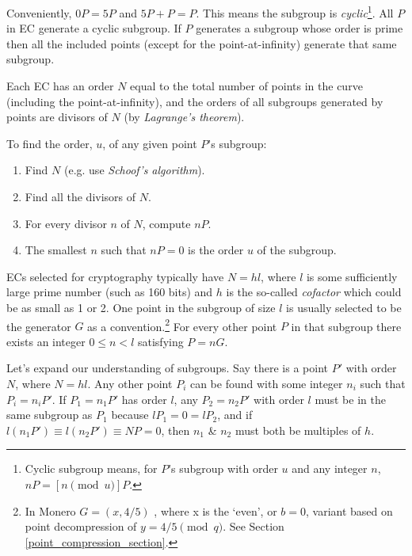 Conveniently, $0P = 5P$ and $5P + P = P$. This means the subgroup is {\em cyclic}\footnote{\label{cyclical_note}Cyclic subgroup means, for $P$'s subgroup with order $u$ and any integer $n$, $n P = [n \pmod{u}] P$.}. All $P$ in EC generate a cyclic subgroup. If $P$ generates a subgroup whose order is prime then all the included points (except for the point-at-infinity) generate that same subgroup.

Each EC has an order $N$ equal to the total number of points in the curve (including the point-at-infinity), and the orders of all subgroups generated by points are divisors of $N$ (by {\em Lagrange’s theorem}). 

To find the order, $u$, of any given point $P$'s subgroup:
\begin{enumerate}
    \item Find $N$ (e.g. use {\em Schoof's algorithm}).
    \item Find all the divisors of $N$.
    \item For every divisor $n$ of $N$, compute $n P$.
    \item The smallest $n$ such that $n P = 0$ is the order $u$ of the subgroup.
\end{enumerate} 

ECs selected for cryptography typically have $N = hl$, where $l$ is some sufficiently large prime number (such as 160 bits) and $h$ is the so-called {\em cofactor} which could be as small as 1 or 2. One point in the subgroup of size $l$ is usually selected to be the generator $G$ as a convention.\footnote{In Monero $G = (x,4/5)$ \cite{Bernstein2012}, where x is the `even', or $b = 0$, variant based on point decompression of \(y = 4/5 \pmod q\). See Section \ref{point_compression_section}.} For every other point $P$ in that subgroup there exists an integer $0 \leq n < l$ satisfying $P = n G$.

Let's expand our understanding of subgroups. Say there is a point $P'$ with order $N$, where $N=h l$. Any other point $P_i$ can be found with some integer $n_i$ such that $P_i=n_i P'$. If $P_1=n_1 P'$ has order $l$, any $P_2=n_2 P'$ with order $l$ must be in the same subgroup as $P_1$ because $l P_1=0 = l P_2$, and if $l(n_1 P') \equiv l(n_2 P') \equiv N P=0$, then $n_1$ \& $n_2$ must both be multiples of $h$. 

